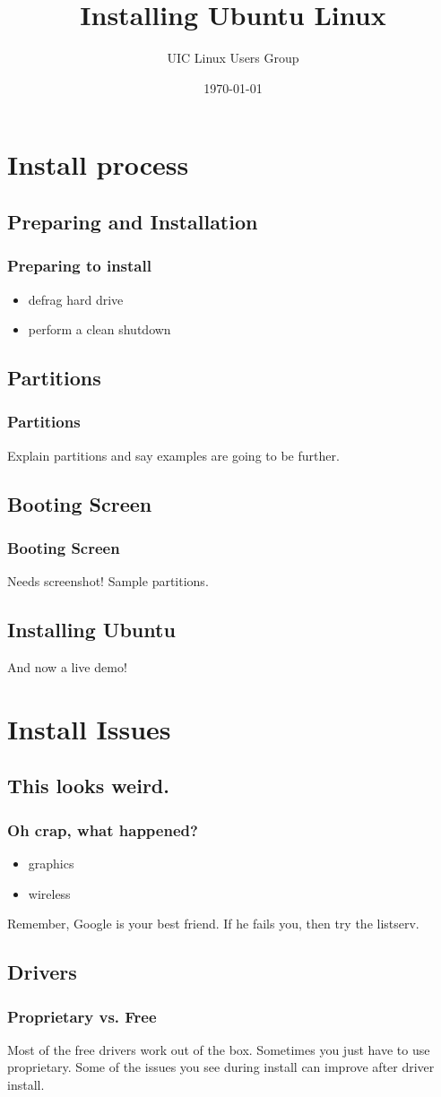 \documentclass[hyperref={pdfpagelabels=false}]{beamer}
\title{Installing Ubuntu Linux}
\author{UIC Linux Users Group}
\date{\today}
\begin{document}
\frame{\titlepage}
\section[outline]{}
\frame[allowframebreaks]{\tableofcontents}
\section{Install process}
\subsection{Preparing and Installation}
\frame
{
    \frametitle{Preparing to install}
    \begin{itemize}
    \item{defrag hard drive}
    \item{perform a clean shutdown}
    \end{itemize}
}
\subsection{Partitions}
\frame
{
	\frametitle{Partitions}
	Explain partitions and say examples are going to be further.
}
\subsection{Booting Screen}
\frame
{
	\frametitle{Booting Screen}
	Needs screenshot! Sample partitions.
}
\subsection{Installing Ubuntu}
\frame
{
	And now a live demo!
}
\section{Install Issues}
\subsection{This looks weird.}
\frame
{
	\frametitle{Oh crap, what happened?}
	\begin{itemize}
	\item{graphics}
	\item{wireless}
	\end{itemize}
	Remember, Google is your best friend. If he fails you, then try the listserv.
}
\subsection{Drivers}
\frame
{
	\frametitle{Proprietary vs. Free}
	Most of the free drivers work out of the box. Sometimes you just have to
use proprietary. Some of the issues you see during install can improve after driver install.
}
\end{document}
